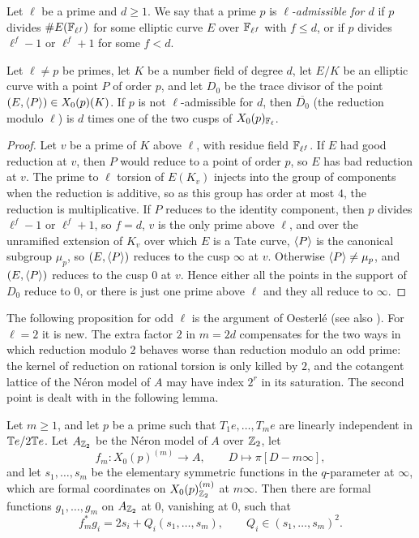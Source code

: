 \begin{definition}
Let $\ell$ be a prime and $d\geq1$. We say that a prime $p$ is \textit{$\ell$-admissible for $d$} if $p$ divides $\#E(\mathbb{F}_{\ell^f})$ for some elliptic curve $E$ over $\mathbb{F}_{\ell^f}$ with $f\leq d$, or if $p$ divides $\ell^f-1$ or $\ell^f+1$ for some $f<d$.
\end{definition}

\begin{lemma}\label{lem:onecusp}
Let $\ell\neq p$ be primes, let $K$ be a number field of degree $d$, let $E/K$ be an elliptic curve with a point $P$ of order $p$, and let $D_0$ be the trace divisor of the point $(E,\langle P\rangle)\in X_0(p)(K)$. If $p$ is not $\ell$-admissible for $d$, then $\overline{D_0}$ (the reduction modulo $\ell$) is $d$ times one of the two cusps of $X_0(p)_{\mathbb{F}_\ell}$.
\end{lemma}

\begin{proof}
Let $v$ be a prime of $K$ above $\ell$, with residue field $\mathbb{F}_{\ell^f}$. If $E$ had good reduction at $v$, then $P$ would reduce to a point of order $p$, so $E$ has bad reduction at $v$. The prime to $\ell$ torsion of $E(K_v)$ injects into the group of components when the reduction is additive, so as this group has order at most $4$, the reduction is multiplicative. If $P$ reduces to the identity component, then $p$ divides $\ell^f-1$ or $\ell^f+1$, so $f=d$, $v$ is the only prime above $\ell$, and over the unramified extension of $K_v$ over which $E$ is a Tate curve, $\langle P\rangle$ is the canonical subgroup $\mu_p$, so $(E,\langle P\rangle)$ reduces to the cusp $\infty$ at $v$. Otherwise $\langle P\rangle\neq\mu_p$, and $(E,\langle P\rangle)$ reduces to the cusp $0$ at $v$. Hence either all the points in the support of $D_0$ reduce to $0$, or there is just one prime above $\ell$ and they all reduce to $\infty$.
\end{proof}

The following proposition for odd $\ell$ is the argument of Oesterl\'e \cite[Section 6]{DKSS} (see also \cite[Theorem 4.18]{parentformal}). For $\ell=2$ it is new. The extra factor $2$ in $m=2d$ compensates for the two ways in which reduction modulo $2$ behaves worse than reduction modulo an odd prime: the kernel of reduction on rational torsion is only killed by $2$, and the cotangent lattice of the N\'eron model of $A$ may have index $2^r$ in its saturation. The second point is dealt with in the following lemma.

\begin{lemma}\label{lem:dyadic}
Let $m\geq1$, and let $p$ be a prime such that $T_1e,\dots,T_me$ are linearly independent in $\mathbb{T} e/2\mathbb{T} e$. Let $A_{\mathbb{Z}_2}$ be the N\'eron model of $A$ over $\mathbb{Z}_2$, let
$$f_m:X_0(p)^{(m)}\to A,\qquad D\mapsto\pi[D-m\infty],$$
and let $s_1,\dots,s_m$ be the elementary symmetric functions in the $q$-parameter at $\infty$, which are formal coordinates on $X_0(p)^{(m)}_{\mathbb{Z}_2}$ at $m\infty$. Then there are formal functions $g_1,\dots,g_m$ on $A_{\mathbb{Z}_2}$ at $0$, vanishing at $0$, such that
$$f_m^*g_i=2s_i+Q_i(s_1,\dots,s_m),\qquad Q_i\in(s_1,\dots,s_m)^2.$$
\end{lemma}

